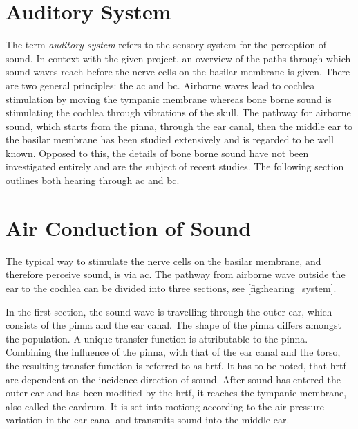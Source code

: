 \section{Auditory System}
The term \textit{auditory system} refers to the sensory system for the perception of sound. In context with the given project, an overview of the paths through which sound waves reach before the nerve cells on the basilar membrane is given. There are two general principles: the \gls{ac} and \gls{bc}. Airborne waves lead to cochlea stimulation by moving the tympanic membrane whereas bone borne sound is stimulating the cochlea through vibrations of the skull. The pathway for airborne sound, which starts from the pinna, through the ear canal, then the middle ear to the basilar membrane has been studied extensively and is regarded to be well known. Opposed to this, the details of bone borne sound have not been investigated entirely \citep{stenfelt_2005} and are the subject of recent studies. The following section outlines both hearing through \gls{ac} and \gls{bc}.


\section{Air Conduction of Sound}
\label{sec:ear_functions}
The typical way to stimulate the nerve cells on the basilar membrane, and therefore perceive sound, is via \gls{ac}. The pathway from airborne wave outside the ear to the cochlea can be divided into three sections, see \autoref{fig:hearing_system}. 


In the first section, the sound wave is travelling through the outer ear, which consists of the pinna and the ear canal. The shape of the pinna differs amongst the population. A unique transfer function is attributable to the pinna. Combining the influence of the pinna, with that of the ear canal and the torso, the resulting transfer function is referred to as \gls{hrtf}. It has to be noted, that \gls{hrtf} are dependent on the incidence direction of sound.%
After sound has entered the outer ear and has been modified by the \gls{hrtf}, it reaches the tympanic membrane, also called the eardrum. It is set into motiong according to the air pressure variation in the ear canal and transmits sound into the middle ear.

